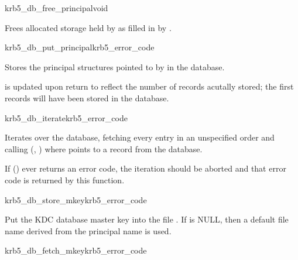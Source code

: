 \begin{funcdecl}{krb5_db_free_principal}{void}{\funcin}
\end{funcdecl}

Frees allocated storage held by  as filled in by
.


\begin{funcdecl}{krb5_db_put_principal}{krb5_error_code}{\funcin}
\end{funcdecl}

Stores the  principal structures pointed to by
 in the database.

 is updated upon return to reflect the number of records
acutally stored; the first  records will have been
stored in the database.


\begin{funcdecl}{krb5_db_iterate}{krb5_error_code}{\funcin}
\funcendfuncarg
{}
\end{funcdecl}

Iterates over the database, fetching every entry in an unspecified order
and calling (,
) where  points to a record from the
database.

If () ever returns an error code, the iteration
should be
aborted and that error code is returned by this function.

\begin{funcdecl}{krb5_db_store_mkey}{krb5_error_code}{\funcin}
\end{funcdecl}

Put the KDC database master key into the file . If
 is NULL, then a default file name derived from the
principal name  is used.

\begin{funcdecl}{krb5_db_fetch_mkey}{krb5_error_code}{\funcin}
\funcinout
{}
\end{funcdecl}

